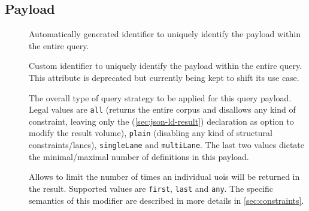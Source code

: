 \documentclass[11pt,a4paper]{article}
\begin{document}
\subsection{Payload}
\label{sec:json-ld-payload}
\begin{attributes}{}
\end{attributes}
\begin{description}
	\item[] Automatically generated identifier to uniquely identify the payload within the entire query.
	\item[] Custom identifier to uniquely identify the payload within the entire query. This attribute is deprecated but currently being kept to shift its use case.
	\item[] The overall type of query strategy to be applied for this query payload. Legal values are \texttt{all} (returns the entire corpus and disallows any kind of constraint, leaving only the  (\ref{sec:json-ld-result}) declaration as option to modify the result volume), \texttt{plain} (disabling any kind of structural constraints/lanes), \texttt{singleLane} and \texttt{multiLane}. The last two values dictate the minimal/maximal number of  definitions in this payload.
	\item[] Allows to limit the number of times an individual \acp{uoi} will be returned in the result. Supported values are \texttt{first}, \texttt{last} and \texttt{any}. The specific semantics of this modifier are described in more details in \cref{sec:constraints}.
\end{description}
\begin{elements}{}
\end{elements}
\end{document}

